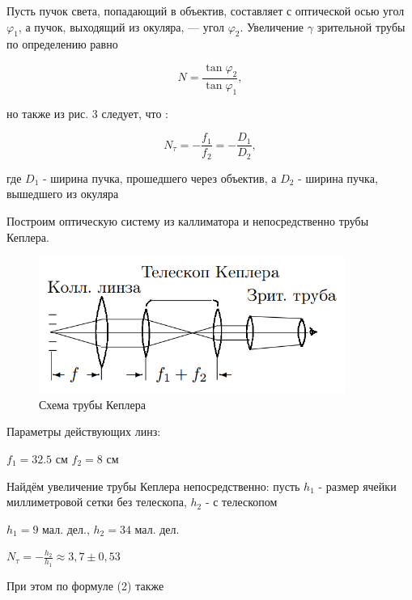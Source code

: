 Пусть пучок света, попадающий в объектив, составляет с оптической осью угол $\varphi_1$, а пучок, выходящий из окуляра, — угол $\varphi_2$. Увеличение $\gamma$ зрительной трубы по определению равно

\begin{equation}
    N = \frac{\tan \varphi_2}{\tan \varphi_1},
\end{equation}

но также из рис. 3 следует, что :

\begin{equation}
    N_{\tau} = -\frac{f_1}{f_2} = -\frac{D_1}{D_2},
\end{equation}

где $D_1$ - ширина пучка, прошедшего через объектив, а $D_2$ - ширина пучка, вышедшего из окуляра

Построим оптическую систему из каллиматора и непосредственно трубы Кеплера. 

\begin{figure}[h!]
        \centering
            \includegraphics[width=10cm]{pics/kepler_2.png}
            \caption{Схема трубы Кеплера}
        \label{}
\end{figure}

Параметры действующих линз:

\begin{center}
    $f_{1} = 32.5$ см \hspace{1cm} $f_2 = 8$ см
\end{center}

Найдём увеличение трубы Кеплера непосредственно: пусть $h_1$ - размер ячейки миллиметровой сетки без телескопа, $h_2$ - с телескопом

\begin{center}
	$h_1 = 9$ мал. дел., \hspace{1cm} $h_2 = 34$ мал. дел. \par

	$N_{\tau} = -\frac{h_2}{h_1} \approx 3,7 \pm 0,53$
\end{center}

При этом по формуле (2) также

